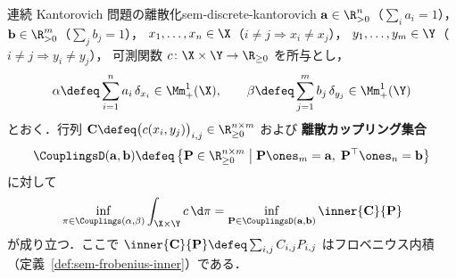 \begin{proposition}{連続 Kantorovich 問題の離散化}{sem-discrete-kantorovich}
  $\mathbf{a} \in \R_{>0}^n$（$\sum_i a_i = 1$），$\mathbf{b} \in \R_{>0}^m$（$\sum_j b_j = 1$），
  $x_1, \ldots, x_n \in \X$（$i \neq j \Rightarrow x_i \neq x_j$），
  $y_1, \ldots, y_m \in \Y$（$i \neq j \Rightarrow y_i \neq y_j$），
  可測関数 $c \colon \X \times \Y \to \R_{\geq 0}$ を所与とし，
  \[
    \alpha \defeq \sum_{i=1}^n a_i\, \delta_{x_i} \in \Mm_+^1(\X), \qquad
    \beta  \defeq \sum_{j=1}^m b_j\, \delta_{y_j} \in \Mm_+^1(\Y)
  \]
  とおく．行列 $\mathbf{C} \defeq \bigl(c(x_i, y_j)\bigr)_{i,j} \in \R_{\geq 0}^{n \times m}$ および
  \textbf{離散カップリング集合}
  \[
    \CouplingsD(\mathbf{a}, \mathbf{b}) \defeq
    \left\{ \mathbf{P} \in \R_{\geq 0}^{n \times m} \;\middle|\;
      \mathbf{P}\ones_m = \mathbf{a},\;
      \mathbf{P}^\top\ones_n = \mathbf{b}
    \right\}
  \]
  に対して
  \[
    \inf_{\pi \in \Couplings(\alpha,\beta)}
      \int_{\X\times\Y} c\,\d\pi
    = \inf_{\mathbf{P} \in \CouplingsD(\mathbf{a}, \mathbf{b})}
      \inner{\mathbf{C}}{\mathbf{P}}
  \]
  が成り立つ．ここで $\inner{\mathbf{C}}{\mathbf{P}} \defeq \sum_{i,j} C_{i,j} P_{i,j}$ はフロベニウス内積
  （定義~\ref{def:sem-frobenius-inner}）である．
\end{proposition}
